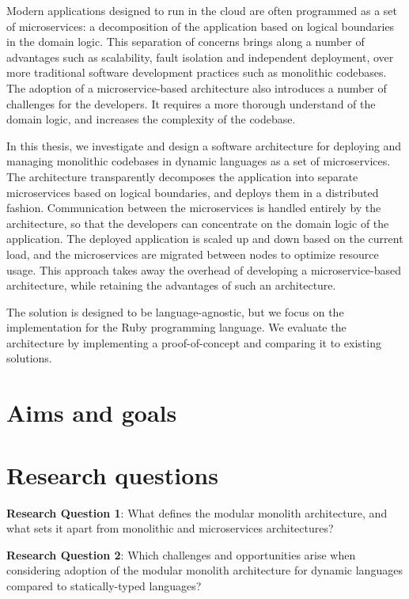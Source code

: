 \documentclass[12pt]{article}
\begin{document}
	Modern applications designed to run in the cloud are often programmed as a set of microservices: a decomposition of the application based on logical boundaries in the domain logic.
	This separation of concerns brings along a number of advantages such as scalability, fault isolation and independent deployment, over more traditional software development practices such as monolithic codebases.
	The adoption of a microservice-based architecture also introduces a number of challenges for the developers.
	It requires a more thorough understand of the domain logic, and increases the complexity of the codebase.

	In this thesis, we investigate and design a software architecture for deploying and managing monolithic codebases in dynamic languages as a set of microservices.
	The architecture transparently decomposes the application into separate microservices based on logical boundaries, and deploys them in a distributed fashion.
	Communication between the microservices is handled entirely by the architecture, so that the developers can concentrate on the domain logic of the application.
	The deployed application is scaled up and down based on the current load, and the microservices are migrated between nodes to optimize resource usage.
	This approach takes away the overhead of developing a microservice-based architecture, while retaining the advantages of such an architecture.

	The solution is designed to be language-agnostic, but we focus on the implementation for the Ruby programming language.
	We evaluate the architecture by implementing a proof-of-concept and comparing it to existing solutions.

	\clearpage

	\section{Aims and goals}\label{sec:aims-and-goals}

	\clearpage

	\section{Research questions}\label{sec:research-questions}

	\textbf{Research Question 1}: What defines the modular monolith architecture, and what sets it apart from monolithic and microservices architectures?

	\textbf{Research Question 2}: Which challenges and opportunities arise when considering adoption of the modular monolith architecture for dynamic languages compared to statically-typed languages?
\end{document}
